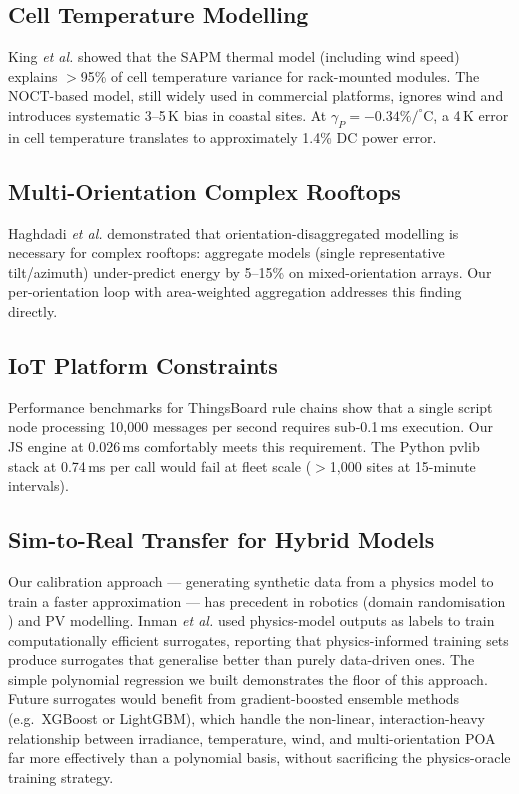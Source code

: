 \documentclass[11pt, a4paper]{article}
\begin{document}
\subsection{Cell Temperature Modelling}

King \textit{et al.} \cite{king2004photovoltaic} showed that the SAPM thermal
model (including wind speed) explains $>$95\% of cell temperature variance for
rack-mounted modules. The NOCT-based model, still widely used in commercial
platforms, ignores wind and introduces systematic 3--5\,K bias in coastal sites.
At $\gamma_P = -0.34\%/^\circ$C, a 4\,K error in cell temperature translates
to approximately 1.4\% DC power error.

\subsection{Multi-Orientation Complex Rooftops}

Haghdadi \textit{et al.} \cite{haghdadi2017method} demonstrated that
orientation-disaggregated modelling is necessary for complex rooftops:
aggregate models (single representative tilt/azimuth) under-predict energy
by 5--15\% on mixed-orientation arrays. Our per-orientation loop with
area-weighted aggregation addresses this finding directly.

\subsection{IoT Platform Constraints}

Performance benchmarks for ThingsBoard rule chains \cite{thingsboard2024perf}
show that a single script node processing 10{,}000 messages per second requires
sub-0.1\,ms execution. Our JS engine at 0.026\,ms comfortably meets this
requirement. The Python pvlib stack at 0.74\,ms per call would fail at fleet
scale ($>$1{,}000 sites at 15-minute intervals).

\subsection{Sim-to-Real Transfer for Hybrid Models}

Our calibration approach --- generating synthetic data from a physics model to
train a faster approximation --- has precedent in robotics (domain randomisation
\cite{tobin2017domain}) and PV modelling. Inman \textit{et al.}
\cite{inman2013solar} used physics-model outputs as labels to train
computationally efficient surrogates, reporting that physics-informed training
sets produce surrogates that generalise better than purely data-driven ones.
The simple polynomial regression we built demonstrates the floor of this
approach. Future surrogates would benefit from gradient-boosted ensemble
methods (e.g.\ XGBoost or LightGBM), which handle the non-linear, interaction-heavy
relationship between irradiance, temperature, wind, and multi-orientation POA
far more effectively than a polynomial basis, without sacrificing
the physics-oracle training strategy.
\end{document}
